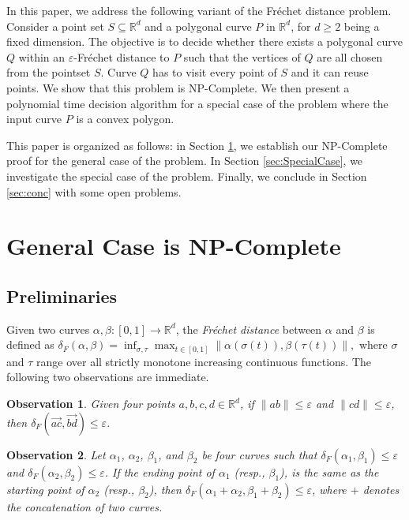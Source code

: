\documentclass[a4paper,UKenglish]{lipics}
\newcommand{\IR}{\ensuremath{\mathbb{R}}}
\newcommand{\lee}{\leqslant}
\newcommand{\gee}{\geqslant}
\newcommand{\eps}{\varepsilon}
\newcommand{\Frechet}{Fr\'echet }
\newcommand{\distF}{\delta_F}
\newcommand{\Dir}{\overrightarrow}
\newcommand{\pset}{S}
\begin{document}
In this paper, we address the following variant of the \Frechet distance problem.
Consider a point set $S \subseteq \IR^d$ and a polygonal curve $P$ in $\IR^d$, 
for $d \gee 2$ being a fixed dimension.
The objective is to decide whether there exists a polygonal curve $Q$ within an  $\eps$-\Frechet
distance to $P$ such that the vertices of $Q$ are all chosen from the 
pointset $\pset$. Curve $Q$ has to visit every point of $\pset$
and it can reuse points. We show that this problem is NP-Complete. 
We then present a polynomial time decision algorithm for a 
special case of the problem where the input curve $P$ is a convex polygon. 

This paper is organized as follows: in Section \ref{sec:NPComp}, 
we establish our NP-Complete proof for the general case of the problem. 
In Section \ref{sec:SpecialCase}, 
we investigate the special case of the problem.
Finally, we conclude in Section \ref{sec:conc} with some open problems.

\section{General Case is NP-Complete}
\label{sec:NPComp}

\subsection{Preliminaries}
Given two curves $\alpha, \beta: [0,1] \rightarrow \IR^d$,
the {\em \Frechet distance\/} between $\alpha$ and $\beta$ is defined as
$
	\distF(\alpha,\beta) = \inf_{\sigma, \tau} \max_{t \in [0,1]} \| \alpha(\sigma(t)), \beta(\tau(t)) \|,
$
where $\sigma$ and $\tau$ range over all strictly monotone increasing continuous functions.
The following two observations are immediate.

\newtheorem{obs}{Observation}

\begin{obs}\label{obs:simple}
	Given four points $a, b,c,d \in \IR^d$, if
	$\| ab\| \lee \eps$ and $\| cd\| \lee \eps$, then
	$\distF(\Dir{ac},\Dir{bd}) \lee \eps$. 
\end{obs}




\begin{obs}\label{obs:concat}
Let $\alpha_1$, $\alpha_2$, $\beta_1$, and $\beta_2$ 
	be four curves 
	such that $\distF(\alpha_1,\beta_1) \lee \eps$ and
	$\distF(\alpha_2,\beta_2) \lee \eps$. 
	If the ending point of $\alpha_1$ (resp., $\beta_1$), 
	is the same as 
	the starting point of $\alpha_2$  (resp., $\beta_2$),
	then $\distF(\alpha_1 + \alpha_2, \beta_1 + \beta_2) \lee \eps$,
	where $+$ denotes the concatenation of two curves.
\end{obs}
\end{document}
